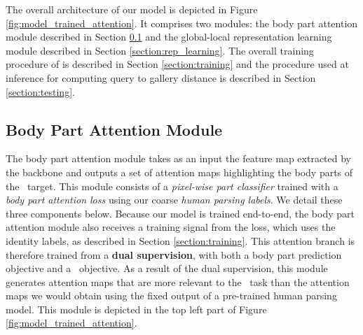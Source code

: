 \documentclass[10pt,twocolumn,letterpaper]{article}
\begin{document}
The overall architecture of our model {\model} is depicted in Figure \ref{fig:model_trained_attention}. 
It comprises two modules: the body part attention module described in Section \ref{section:attention_module} and the global-local representation learning module described in Section \ref{section:rep_learning}.
The overall training procedure of {\model} is described in Section \ref{section:training} and the procedure used at inference for computing query to gallery distance is described in Section \ref{section:testing}.


























\subsection{Body Part Attention Module} \label{section:attention_module} 

The body part attention module takes as an input the feature map extracted by the backbone and outputs a set of attention maps highlighting the body parts of the \reid\ target.
This module consists of a \textit{pixel-wise part classifier} trained with a \textit{body part attention loss} using our coarse \textit{human parsing labels}.
We detail these three components below.
Because our model is trained end-to-end, the body part attention module also receives a training signal from the {\reid} loss, which uses the identity labels, as described in Section \ref{section:training}.
This attention branch is therefore trained from a \textbf{dual supervision}, with both a body part prediction objective and a \reid\ objective.
As a result of the dual supervision, this module generates attention maps that are more relevant to the \reid\ task than the attention maps we would obtain using the fixed output of a pre-trained human parsing model.
This module is depicted in the top left part of Figure \ref{fig:model_trained_attention}.
\end{document}
